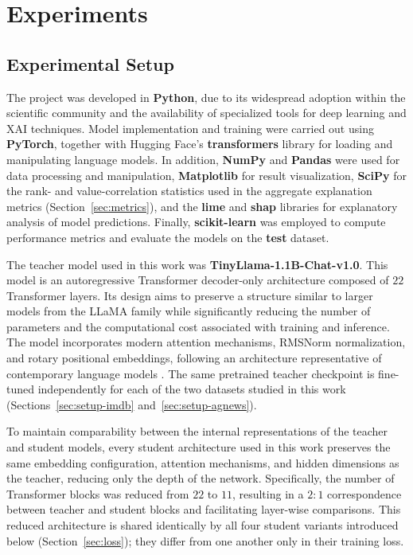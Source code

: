 \documentclass[conference]{IEEEtran}
\begin{document}
\section{Experiments}\label{sec:experiments}

\subsection{Experimental Setup}\label{sec:setup}

The project was developed in \textbf{Python}, due to its widespread adoption within the scientific community and the availability of specialized tools for deep learning and XAI techniques. Model implementation and training were carried out using \textbf{PyTorch}, together with Hugging Face's \textbf{transformers} library for loading and manipulating language models. In addition, \textbf{NumPy} and \textbf{Pandas} were used for data processing and manipulation, \textbf{Matplotlib} for result visualization, \textbf{SciPy} for the rank- and value-correlation statistics used in the aggregate explanation metrics (Section~\ref{sec:metrics}), and the \textbf{lime} and \textbf{shap} libraries for explanatory analysis of model predictions. Finally, \textbf{scikit-learn} was employed to compute performance metrics and evaluate the models on the \textbf{test} dataset.

The teacher model used in this work was \textbf{TinyLlama-1.1B-Chat-v1.0}. This model is an autoregressive Transformer decoder-only architecture \cite{vaswani2017attention} composed of $22$ Transformer layers. Its design aims to preserve a structure similar to larger models from the LLaMA family while significantly reducing the number of parameters and the computational cost associated with training and inference. The model incorporates modern attention mechanisms, RMSNorm normalization, and rotary positional embeddings, following an architecture representative of contemporary language models \cite{zhang2024tinyllama}. The same pretrained teacher checkpoint is fine-tuned independently for each of the two datasets studied in this work (Sections~\ref{sec:setup-imdb} and~\ref{sec:setup-agnews}).

To maintain comparability between the internal representations of the teacher and student models, every student architecture used in this work preserves the same embedding configuration, attention mechanisms, and hidden dimensions as the teacher, reducing only the depth of the network. Specifically, the number of Transformer blocks was reduced from $22$ to $11$, resulting in a $2:1$ correspondence between teacher and student blocks and facilitating layer-wise comparisons. This reduced architecture is shared identically by all four student variants introduced below (Section~\ref{sec:loss}); they differ from one another only in their training loss.
\end{document}
